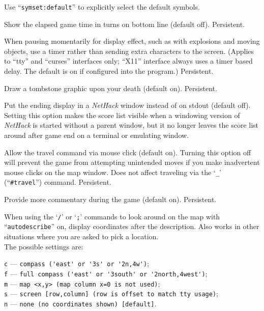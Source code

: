 Use ``{\tt symset:default}'' to explicitly select the default symbols.
\item[\ib{time}]
Show the elapsed game time in turns on bottom line (default off).  Persistent.
\item[\ib{timed\verb+_+delay}]
When pausing momentarily for display effect, such as with explosions and
moving objects, use a timer rather than sending extra characters to the
screen.  (Applies to ``tty'' and ``curses'' interfaces only; ``X11'' interface always
uses a timer based delay.  The default is on if configured into the
program.)  Persistent.
\item[\ib{tombstone}]
Draw a tombstone graphic upon your death (default on).  Persistent.
\item[\ib{toptenwin}]
Put the ending display in a {\it NetHack\/} window instead of on stdout (default off).
Setting this option makes the score list visible when a windowing version
of {\it NetHack\/} is started without a parent window, but it no longer leaves
the score list around after game end on a terminal or emulating window.
\item[\ib{travel}]
Allow the travel command via mouse click (default on).
Turning this option off will prevent the game from attempting unintended
moves if you make inadvertent mouse clicks on the map window.
Does not affect traveling via the `{\tt \verb+_+}' (``{\tt \#travel}'')
command.  Persistent.
\item[\ib{verbose}]
Provide more commentary during the game (default on).  Persistent.
\item[\ib{whatis\verb+_+coord}]
When using the `{\tt /}' or `{\tt ;}' commands to look around on the map with
``{\tt autodescribe}''
on, display coordinates after the description.
Also works in other situations where you are asked to pick a location.\\

The possible settings are:

{\tt c} --- \verb#compass ('east' or '3s' or '2n,4w')#;\\
{\tt f} --- \verb#full compass ('east' or '3south' or '2north,4west')#;\\
{\tt m} --- \verb#map <x,y> (map column x=0 is not used)#;\\
{\tt s} --- \verb#screen [row,column] (row is offset to match tty usage)#;\\
{\tt n} --- \verb#none (no coordinates shown) [default]#.

